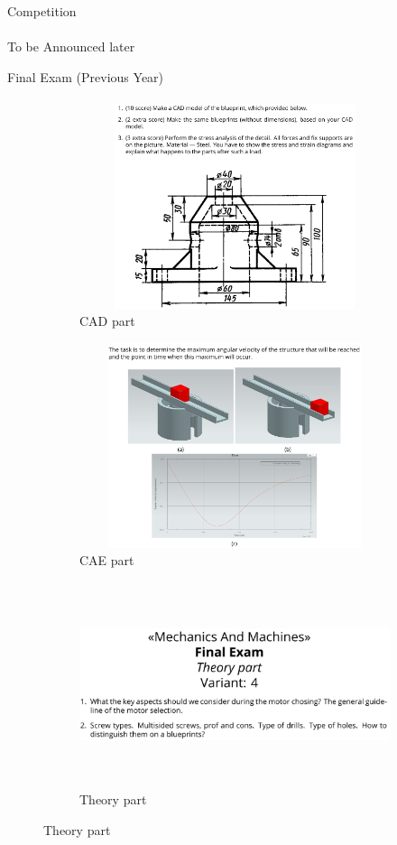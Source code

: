 \documentclass[aspectratio=169]{beamer}
\begin{document}
\begin{frame}[c]{Competition}
    \framesubtitle{}
    \LARGE \centering To be Announced later
\end{frame}
\begin{frame}[t]{Final Exam (Previous Year)}
    \framesubtitle{}
        \begin{figure}[H]
            \begin{subfigure}{0.32\textwidth}
                \centering\includegraphics[height=6cm,width=1\textwidth,keepaspectratio]{resources/ex1.png}
                \caption*{CAD part}
                \label{fig:resources/ex1.png}
            \end{subfigure}
            \begin{subfigure}{0.32\textwidth}
                \centering\includegraphics[height=6cm,width=1\textwidth,keepaspectratio]{resources/ex2.png}
                \caption*{CAE part}
                \label{fig:resources/ex2.png}
            \end{subfigure}
            \begin{subfigure}{0.32\textwidth}
                \centering\includegraphics[height=6cm,width=1\textwidth,keepaspectratio]{resources/ex3.png}
                \caption*{Theory part}
                \label{fig:resources/ex3.png}
            \end{subfigure}
        \end{figure}
    \end{frame}
\end{document}
